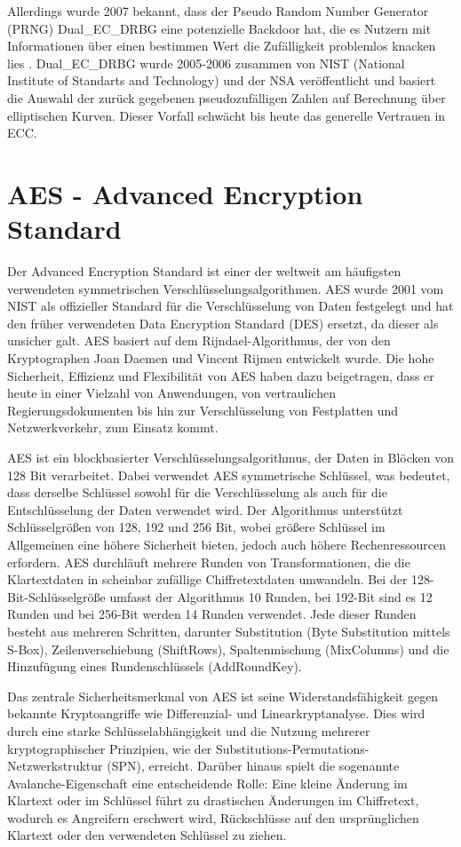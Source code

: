\documentclass[
	fontsize=12pt,
	headings=small,
	parskip=half,           %
	bibliography=totoc,
	numbers=noenddot,       %
	open=any,               %
]{scrreprt}
\begin{document}
Allerdings wurde 2007 bekannt, dass der Pseudo Random Number Generator (PRNG) Dual\_EC\_DRBG eine potenzielle Backdoor hat, die es Nutzern mit Informationen über einen bestimmen Wert die Zufälligkeit problemlos knacken lies \cite{ecc-green2013backdoor}. Dual\_EC\_DRBG wurde 2005-2006 zusammen von NIST (National Institute of Standarts and Technology) und der NSA veröffentlicht und basiert die Auswahl der zurück gegebenen pseudozufälligen Zahlen auf Berechnung über elliptischen Kurven. Dieser Vorfall schwächt bis heute das generelle Vertrauen in ECC. \cite{ecc-cloud2013elliptic}

\section{AES - Advanced Encryption Standard}
\label{sec:aes}
Der Advanced Encryption Standard ist einer der weltweit am häufigsten verwendeten symmetrischen Verschlüsselungsalgorithmen. AES wurde 2001 vom NIST als offizieller Standard für die Verschlüsselung von Daten festgelegt und hat den früher verwendeten Data Encryption Standard (DES) ersetzt, da dieser als unsicher galt. AES basiert auf dem Rijndael-Algorithmus, der von den Kryptographen Joan Daemen und Vincent Rijmen entwickelt wurde. Die hohe Sicherheit, Effizienz und Flexibilität von AES haben dazu beigetragen, dass er heute in einer Vielzahl von Anwendungen, von vertraulichen Regierungsdokumenten bis hin zur Verschlüsselung von Festplatten und Netzwerkverkehr, zum Einsatz kommt.

AES ist ein blockbasierter Verschlüsselungsalgorithmus, der Daten in Blöcken von 128 Bit verarbeitet. Dabei verwendet AES symmetrische Schlüssel, was bedeutet, dass derselbe Schlüssel sowohl für die Verschlüsselung als auch für die Entschlüsselung der Daten verwendet wird. Der Algorithmus unterstützt Schlüsselgrößen von 128, 192 und 256 Bit, wobei größere Schlüssel im Allgemeinen eine höhere Sicherheit bieten, jedoch auch höhere Rechenressourcen erfordern. AES durchläuft mehrere Runden von Transformationen, die die Klartextdaten in scheinbar zufällige Chiffretextdaten umwandeln. Bei der 128-Bit-Schlüsselgröße umfasst der Algorithmus 10 Runden, bei 192-Bit sind es 12 Runden und bei 256-Bit werden 14 Runden verwendet. Jede dieser Runden besteht aus mehreren Schritten, darunter Substitution (Byte Substitution mittels S-Box), Zeilenverschiebung (ShiftRows), Spaltenmischung (MixColumns) und die Hinzufügung eines Rundenschlüssels (AddRoundKey).

Das zentrale Sicherheitsmerkmal von AES ist seine Widerstandsfähigkeit gegen bekannte Kryptoangriffe wie Differenzial- und Linearkryptanalyse. Dies wird durch eine starke Schlüsselabhängigkeit und die Nutzung mehrerer kryptographischer Prinzipien, wie der Substitutions-Permutations-Netzwerkstruktur (SPN), erreicht. Darüber hinaus spielt die sogenannte Avalanche-Eigenschaft eine entscheidende Rolle: Eine kleine Änderung im Klartext oder im Schlüssel führt zu drastischen Änderungen im Chiffretext, wodurch es Angreifern erschwert wird, Rückschlüsse auf den ursprünglichen Klartext oder den verwendeten Schlüssel zu ziehen.\\
\end{document}
